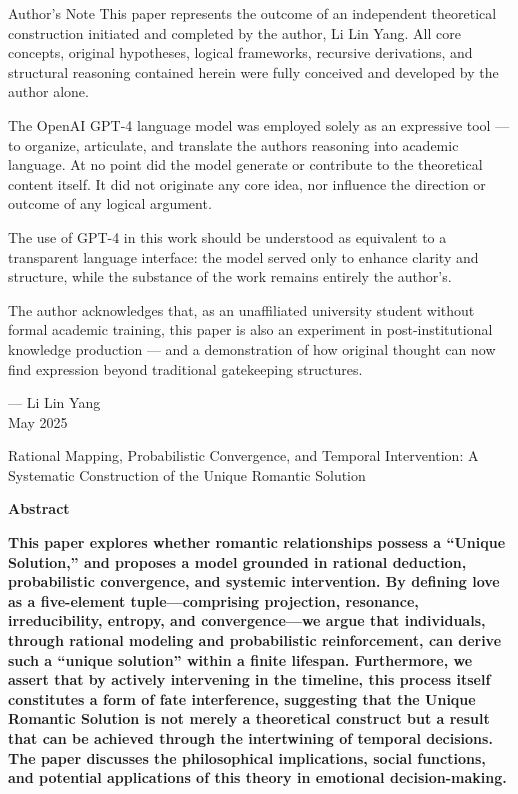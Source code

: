 \documentclass[
]{article}
\author{}
\date{}
\begin{document}
Author's Note\textbf{\hfill\break
}This paper represents the outcome of an independent theoretical
construction initiated and completed by the author, Li Lin Yang. All
core concepts, original hypotheses, logical frameworks, recursive
derivations, and structural reasoning contained herein were fully
conceived and developed by the author alone.

The OpenAI GPT-4 language model was employed solely as an expressive
tool --- to organize, articulate, and translate the
author\textquotesingle s reasoning into academic language. At no point
did the model generate or contribute to the theoretical content itself.
It did not originate any core idea, nor influence the direction or
outcome of any logical argument.

The use of GPT-4 in this work should be understood as equivalent to a
transparent language interface: the model served only to enhance clarity
and structure, while the substance of the work remains entirely the
author's.

The author acknowledges that, as an unaffiliated university student
without formal academic training, this paper is also an experiment in
post-institutional knowledge production --- and a demonstration of how
original thought can now find expression beyond traditional gatekeeping
structures.

--- Li Lin Yang\\
May 2025

Rational Mapping, Probabilistic Convergence, and Temporal Intervention:
A Systematic Construction of the Unique Romantic Solution

\textbf{Abstract}

\textbf{This paper explores whether romantic relationships possess a
``Unique Solution,'' and proposes a model grounded in rational
deduction, probabilistic convergence, and systemic intervention. By
defining love as a five-element tuple---comprising projection,
resonance, irreducibility, entropy, and convergence---we argue that
individuals, through rational modeling and probabilistic reinforcement,
can derive such a ``unique solution'' within a finite lifespan.
Furthermore, we assert that by actively intervening in the timeline,
this process itself constitutes a form of fate interference, suggesting
that the Unique Romantic Solution is not merely a theoretical construct
but a result that can be achieved through the intertwining of temporal
decisions. The paper discusses the philosophical implications, social
functions, and potential applications of this theory in emotional
decision-making.}
\end{document}
